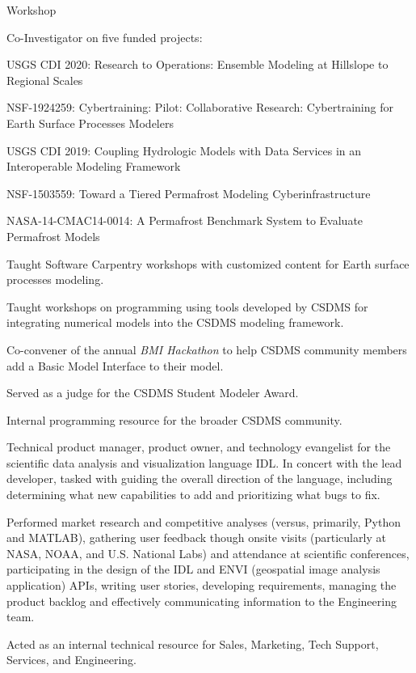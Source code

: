 \begin{compactitem}[\itembullet]
\begin{compactitem}[\itembullet]
        Workshop
    \end{compactitem}
  \item Co-Investigator on five funded projects:
    \begin{compactitem}[\itembullet]
      \item
        USGS CDI 2020: Research to Operations: Ensemble Modeling at
        Hillslope to Regional Scales
      \item
        NSF-1924259: Cybertraining: Pilot: Collaborative Research:
        Cybertraining for Earth Surface Processes Modelers
      \item
        USGS CDI 2019: Coupling Hydrologic Models with Data Services
        in an Interoperable Modeling Framework
      \item
        NSF-1503559: Toward a Tiered Permafrost Modeling Cyberinfrastructure
      \item
        NASA-14-CMAC14-0014: A Permafrost Benchmark System to Evaluate
        Permafrost Models
    \end{compactitem}
  \item
    Taught Software Carpentry workshops with customized content for
    Earth surface processes modeling.
  \item
    Taught workshops on programming using tools developed by CSDMS for
    integrating numerical models into the CSDMS modeling framework.
  \item
    Co-convener of the annual \textit{BMI Hackathon} to help CSDMS
    community members add a Basic Model Interface to their model.
  \item
    Served as a judge for the CSDMS Student Modeler Award.
  \item Internal programming resource for the broader CSDMS community.
\end{compactitem}

\begin{compactitem}[\itembullet]
  \item Technical product manager, product owner, and technology
    evangelist for the scientific data analysis and visualization
    language IDL. In concert with the lead developer, tasked with
    guiding the overall direction of the language, including
    determining what new capabilities to add and prioritizing what
    bugs to fix.
  \item Performed market research and competitive analyses (versus,
    primarily, Python and MATLAB), gathering user feedback though
    onsite visits (particularly at NASA, NOAA, and U.S. National Labs)
    and attendance at scientific conferences, participating in the
    design of the IDL and ENVI (geospatial image analysis application)
    APIs, writing user stories, developing requirements, managing the
    product backlog and effectively communicating information to the
    Engineering team.
  \item Acted as an internal technical resource for Sales, Marketing,
    Tech Support, Services, and Engineering.
\end{compactitem}

